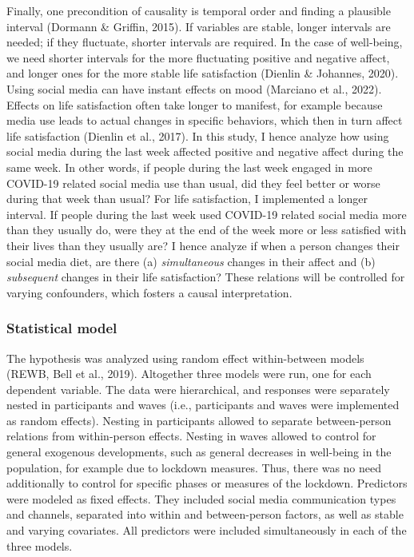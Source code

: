 \documentclass[
  man,floatsintext]{apa7}
\begin{document}
Finally, one precondition of causality is temporal order and finding a plausible interval (Dormann \& Griffin, 2015).
If variables are stable, longer intervals are needed; if they fluctuate, shorter intervals are required.
In the case of well-being, we need shorter intervals for the more fluctuating positive and negative affect, and longer ones for the more stable life satisfaction (Dienlin \& Johannes, 2020).
Using social media can have instant effects on mood (Marciano et al., 2022).
Effects on life satisfaction often take longer to manifest, for example because media use leads to actual changes in specific behaviors, which then in turn affect life satisfaction (Dienlin et al., 2017).
In this study, I hence analyze how using social media during the last week affected positive and negative affect during the same week.
In other words, if people during the last week engaged in more COVID-19 related social media use than usual, did they feel better or worse during that week than usual?
For life satisfaction, I implemented a longer interval.
If people during the last week used COVID-19 related social media more than they usually do, were they at the end of the week more or less satisfied with their lives than they usually are?
I hence analyze if when a person changes their social media diet, are there (a) \emph{simultaneous} changes in their affect and (b) \emph{subsequent} changes in their life satisfaction?
These relations will be controlled for varying confounders, which fosters a causal interpretation.

\hypertarget{statistical-model}{%
\subsubsection{Statistical model}\label{statistical-model}}

The hypothesis was analyzed using random effect within-between models (REWB, Bell et al., 2019).
Altogether three models were run, one for each dependent variable.
The data were hierarchical, and responses were separately nested in participants and waves (i.e., participants and waves were implemented as random effects).
Nesting in participants allowed to separate between-person relations from within-person effects.
Nesting in waves allowed to control for general exogenous developments, such as general decreases in well-being in the population, for example due to lockdown measures.
Thus, there was no need additionally to control for specific phases or measures of the lockdown.
Predictors were modeled as fixed effects.
They included social media communication types and channels, separated into within and between-person factors, as well as stable and varying covariates.
All predictors were included simultaneously in each of the three models.
\end{document}
